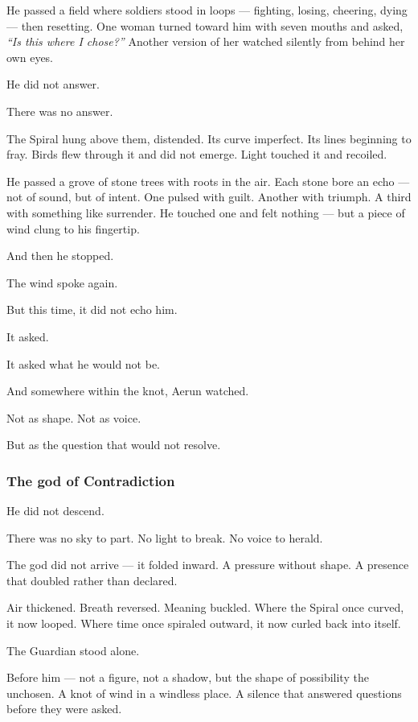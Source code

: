 \documentclass[12pt]{article}
\begin{document}
He passed a field where soldiers stood in loops — fighting, losing, cheering, dying — then resetting. One woman turned toward him with seven mouths and asked, \textit{``Is this where I chose?''} Another version of her watched silently from behind her own eyes.

He did not answer.

There was no answer.

The Spiral hung above them, distended. Its curve imperfect. Its lines beginning to fray. Birds flew through it and did not emerge. Light touched it and recoiled.

He passed a grove of stone trees with roots in the air. Each stone bore an echo — not of sound, but of intent. One pulsed with guilt. Another with triumph. A third with something like surrender. He touched one and felt nothing — but a piece of wind clung to his fingertip.

And then he stopped.

The wind spoke again.

But this time, it did not echo him.

It asked.

It asked what he would not be.

And somewhere within the knot, Aerun watched.

Not as shape. Not as voice.

But as the question that would not resolve.

\dotfill

\subsubsection{The god of Contradiction}

He did not descend.

There was no sky to part. No light to break. No voice to herald.

The god did not arrive — it folded inward. A pressure without shape. A presence that doubled rather than declared.

Air thickened. Breath reversed. Meaning buckled. Where the Spiral once curved, it now looped. Where time once spiraled outward, it now curled back into itself.

The Guardian stood alone.

Before him — not a figure, not a shadow, but the shape of possibility the unchosen. A knot of wind in a windless place. A silence that answered questions before they were asked.
\end{document}
